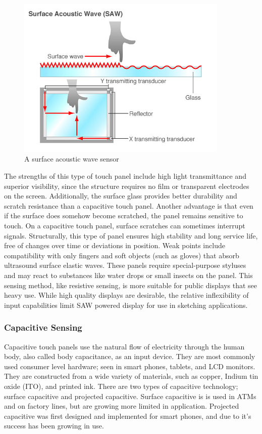 \documentclass[11pt]{report}
\begin{document}
\begin{center}
\begin{figure}
\includegraphics[width=0.9\textwidth]{saw}
\caption{A surface acoustic wave sensor}
\end{figure}
\end{center}

The strengths of this type of touch panel include high light transmittance and superior visibility, since the structure requires no film or transparent electrodes on the screen. 
Additionally, the surface glass provides better durability and scratch resistance than a capacitive touch panel. 
Another advantage is that even if the surface does somehow become scratched, the panel remains sensitive to touch. 
On a capacitive touch panel, surface scratches can sometimes interrupt signals. 
Structurally, this type of panel ensures high stability and long service life, free of changes over time or deviations in position.
Weak points include compatibility with only fingers and soft objects (such as gloves) that absorb ultrasound surface elastic waves. 
These panels require special-purpose styluses and may react to substances like water drops or small insects on the panel.
This sensing method, like resistive sensing, is more suitable for public displays that see heavy use.
While high quality displays are desirable, the relative inflexibility of input capabilities limit SAW powered display for use in sketching applications.



\subsubsection{Capacitive Sensing}
Capacitive touch panels use the natural flow of electricity through the human body, also called body capacitance, as an input device.
They are most commonly used consumer level hardware; seen in smart phones, tablets, and LCD monitors.
They are constructed from a wide variety of materials, such as copper, Indium tin oxide (ITO), and printed ink.
There are two types of capacitive technology; surface capacitive and projected capacitive.
Surface capacitive is is used in ATMs and on factory lines, but are growing more limited in application.
Projected capacitive was first designed and implemented for smart phones, and due to it's success has been growing in use.
\end{document}
